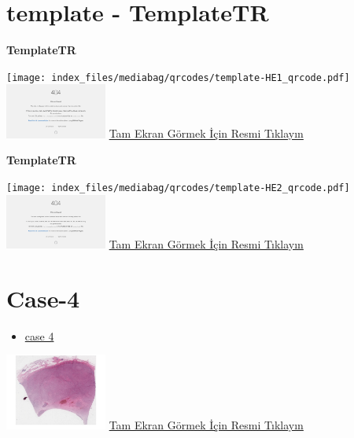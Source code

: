 \documentclass[
  letterpaper,
  DIV=11,
  numbers=noendperiod]{scrreprt}
\providecommand{\tightlist}{%
  \setlength{\itemsep}{0pt}\setlength{\parskip}{0pt}}\usepackage{longtable,booktabs,array}
\begin{document}
\hypertarget{sec-template}{%
\section{template - TemplateTR}\label{sec-template}}

\textbf{TemplateTR}

\texttt{[image: index\_files/mediabag/qrcodes/template-HE1\_qrcode.pdf]}
\href{https://images.patolojiatlasi.com/template/HE1.html}{\includegraphics[width=0.25\textwidth,height=\textheight]{./screenshots/thumbnail_template-HE1.png}}
\href{https://images.patolojiatlasi.com/template/HE1.html}{Tam Ekran
Görmek İçin Resmi Tıklayın}

\textbf{TemplateTR}

\texttt{[image: index\_files/mediabag/qrcodes/template-HE2\_qrcode.pdf]}
\href{https://images.patolojiatlasi.com/template/HE2.html}{\includegraphics[width=0.25\textwidth,height=\textheight]{./screenshots/thumbnail_template-HE2.png}}
\href{https://images.patolojiatlasi.com/template/HE2.html}{Tam Ekran
Görmek İçin Resmi Tıklayın}

\hypertarget{sec-hacettepe-case-of-the-month-case-4}{%
\section{Case-4}\label{sec-hacettepe-case-of-the-month-case-4}}

\begin{itemize}
\tightlist
\item
  \href{https://www.youtube.com/watch?v=Akp6H3myCIo&ab_channel=KemalKosemehmetoglu}{case
  4}
\end{itemize}

\href{https://images.patolojiatlasi.com/hacettepe-com-case-4/HE.html}{\includegraphics[width=0.25\textwidth,height=\textheight]{./screenshots/thumbnail_hacettepe-com-case-4-1.png}}
\href{https://images.patolojiatlasi.com/hacettepe-com-case-4/HE1.html}{Tam
Ekran Görmek İçin Resmi Tıklayın}
\end{document}
